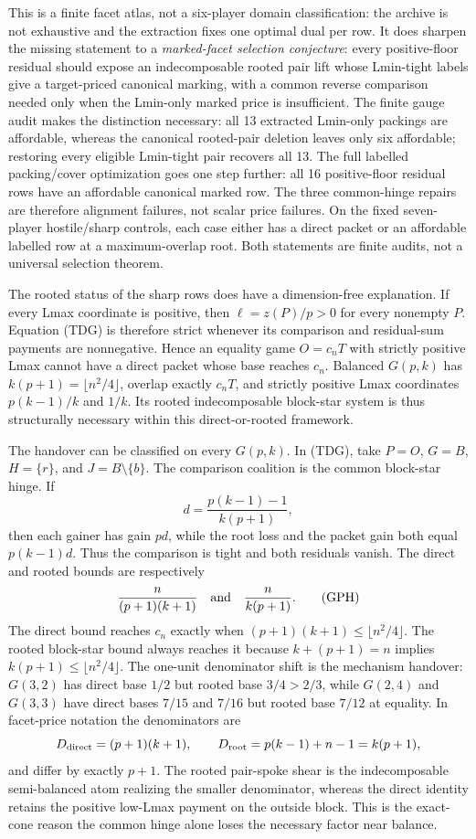 \documentclass[11pt]{article}
\begin{document}
This is a finite facet atlas, not a six-player domain classification: the
archive is not exhaustive and the extraction fixes one optimal dual per row.
It does sharpen the missing statement to a \emph{marked-facet selection
conjecture}: every positive-floor residual should expose an indecomposable
rooted pair lift whose Lmin-tight labels give a target-priced canonical
marking, with a common reverse comparison needed only when the Lmin-only
marked price is insufficient.  The finite gauge audit makes the distinction
necessary: all 13 extracted Lmin-only packings are affordable, whereas the
canonical rooted-pair deletion leaves only six affordable; restoring every
eligible Lmin-tight pair recovers all 13.
The full labelled packing/cover optimization goes one step further: all 16
positive-floor residual rows have an affordable canonical marked row.  The
three common-hinge repairs are therefore alignment failures, not scalar
price failures.  On the fixed seven-player hostile/sharp controls, each case
either has a direct packet or an affordable labelled row at a
maximum-overlap root.  Both statements are finite audits, not a universal
selection theorem.

The rooted status of the sharp rows does have a dimension-free explanation.
If every Lmax coordinate is positive, then $\ell=z(P)/p>0$ for every
nonempty $P$.  Equation (TDG) is therefore strict whenever its comparison
and residual-sum payments are nonnegative.  Hence an equality game
$O=c_nT$ with strictly positive Lmax cannot have a direct packet whose base
reaches $c_n$.  Balanced $G(p,k)$ has $k(p+1)=\lfloor n^2/4\rfloor$,
overlap exactly $c_nT$, and strictly positive Lmax coordinates
$p(k-1)/k$ and $1/k$.  Its rooted indecomposable block-star system is thus
structurally necessary within this direct-or-rooted framework.

The handover can be classified on every $G(p,k)$.  In (TDG), take
$P=O$, $G=B$, $H=\{r\}$, and $J=B\setminus\{b\}$.  The comparison coalition
is the common block-star hinge.  If
\[
 d=\frac{p(k-1)-1}{k(p+1)},
\]
then each gainer has gain $pd$, while the root loss and the packet gain both
equal $p(k-1)d$.  Thus the comparison is tight and both residuals vanish.
The direct and rooted bounds are respectively
\[
 \frac{n}{(p+1)(k+1)}
 \quad\hbox{and}\quad
 \frac{n}{k(p+1)}.                                  \tag{GPH}
\]
The direct bound reaches $c_n$ exactly when
$(p+1)(k+1)\le\lfloor n^2/4\rfloor$.  The rooted block-star bound always
reaches it because $k+(p+1)=n$ implies
$k(p+1)\le\lfloor n^2/4\rfloor$.  The one-unit denominator shift is the
mechanism handover: $G(3,2)$ has direct base $1/2$ but rooted base
$3/4>2/3$, while $G(2,4)$ and $G(3,3)$ have direct bases $7/15$ and $7/16$
but rooted base $7/12$ at equality.
In facet-price notation the denominators are
\[
 D_{\rm direct}=(p+1)(k+1),\qquad
 D_{\rm root}=p(k-1)+n-1=k(p+1),
\]
and differ by exactly $p+1$.  The rooted pair-spoke shear is the
indecomposable semi-balanced atom realizing the smaller denominator, whereas
the direct identity retains the positive low-Lmax payment on the outside
block.  This is the exact-cone reason the common hinge alone loses the
necessary factor near balance.
\end{document}
